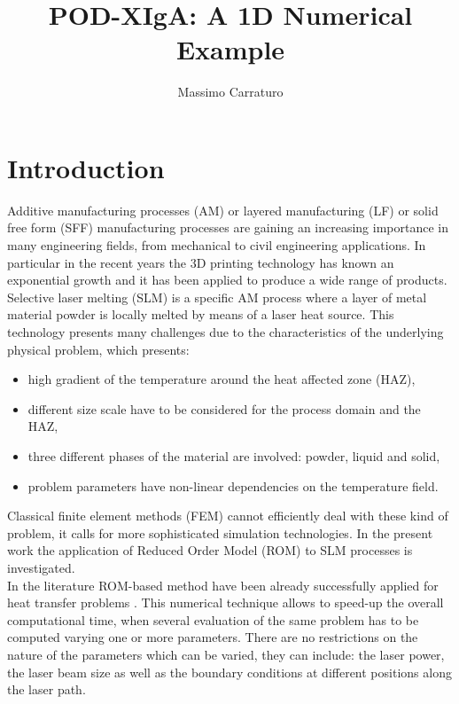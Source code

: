 \documentclass[3p]{article}
\begin{document}
\title { POD-XIgA: A 1D Numerical Example}
\author{Massimo Carraturo}

\maketitle


\section*{Introduction}
\indent Additive manufacturing processes (AM) or layered manufacturing (LF) or solid free form (SFF) manufacturing processes are gaining an increasing importance in many engineering fields, from mechanical to civil engineering applications. In particular in the recent years the 3D printing technology has known an exponential growth and it has been applied to produce a wide range of products. Selective laser melting (SLM) is a specific AM process where a layer of metal material powder is locally melted by means of a laser heat source. This technology presents many challenges due to the characteristics of the underlying physical problem, which presents:
\begin{itemize}
\item  high gradient of the temperature around the heat affected zone (HAZ),
\item  different size scale have to be considered for the process domain and the HAZ,
\item  three different phases of the material are involved: powder, liquid and solid,
\item  problem parameters have non-linear dependencies on the temperature field. 
\end{itemize}
Classical finite element methods (FEM) cannot efficiently deal with these kind of problem, it calls for more sophisticated simulation technologies. In the present work the application of Reduced Order Model (ROM) \cite{Rozza2009, Hesthaven_2016} to SLM processes is investigated. \\
\indent In the literature ROM-based method have been already successfully applied for heat transfer problems \cite{brands_2016, Rozza2_2009}. This numerical technique allows to speed-up the overall computational time, when several evaluation of the same problem has to be computed varying one or more parameters. There are no restrictions on the nature of the parameters which can be varied, they can include: the laser power, the laser beam size as well as the boundary conditions at different positions along the laser path.
\end{document}
